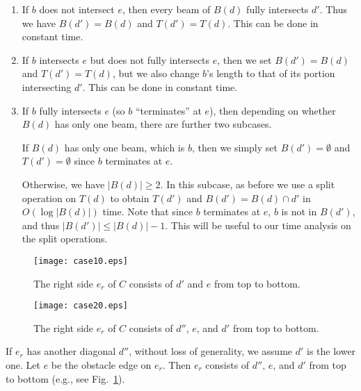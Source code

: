 \documentclass[english,runningheads,11pt]{llncs-revised}
\begin{document}
\begin{enumerate}
\item
If $b$ does not intersect $e$, then every beam of $B(d)$ fully
intersects $d'$. Thus we have $B(d')=B(d)$ and $T(d')=T(d)$. This can be done in constant time.

\item
If $b$ intersects $e$ but does not fully intersects $e$, then we
set $B(d')=B(d)$ and $T(d')=T(d)$, but we also change $b$'s length to that of its
portion intersecting $d'$.
This can be done in constant time.

\item
If $b$ fully intersects $e$ (so $b$ ``terminates'' at $e$), then depending on whether $B(d)$ has only one beam, there are further two subcases.

If $B(d)$ has only one beam, which is $b$, then we simply set $B(d')=\emptyset$ and $T(d')=\emptyset$ since $b$ terminates at $e$.

Otherwise, we have $|B(d)|\geq 2$. In this subcase, as before we use a split
operation on $T(d)$ to obtain $T(d')$ and $B(d')=B(d)\cap d'$ in $O(\log |B(d)|)$ time.
Note that since $b$ terminates at $e$, $b$ is not in $B(d')$, and thus
$|B(d')|\leq |B(d)|-1$. This will be useful to our time analysis on the split operations.
\end{enumerate}


\begin{figure}[t]
\begin{minipage}[t]{0.49\linewidth}
\begin{center}
\texttt{[image: case10.eps]}
\caption{\footnotesize The right side $e_r$ of $C$ consists of $d'$ and $e$ from top to bottom.}
\label{fig:case10}
\end{center}
\end{minipage}
\hspace*{0.02in}
\begin{minipage}[t]{0.49\linewidth}
\begin{center}
\texttt{[image: case20.eps]}
\caption{\footnotesize The right side $e_r$ of $C$ consists of $d''$, $e$, and $d'$ from top to bottom.  }
\label{fig:case20}
\end{center}
\end{minipage}
\vspace{-0.15in}
\end{figure}

If $e_r$ has another diagonal $d''$,
without loss of generality, we assume $d'$ is the lower one.
Let $e$ be the obstacle edge on $e_r$. Then $e_r$  consists of $d''$,
$e$, and $d'$ from top to bottom (e.g., see Fig.~\ref{fig:case20}).
\end{document}
